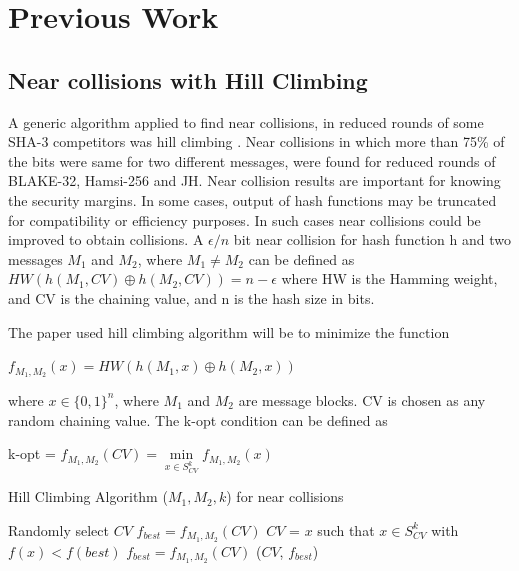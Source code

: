 \documentclass[12pt]{artikel3}                  %
\begin{document}
\section{Previous Work}

\subsection{Near collisions with Hill Climbing}

A generic algorithm applied to find near collisions, in reduced rounds of some SHA-3 competitors was hill climbing
\cite{00029}. Near collisions in which more than 75\% of the bits were same for two different messages, were found 
for reduced rounds of BLAKE-32, Hamsi-256 and JH. Near collision results are important for knowing the security
margins. In some cases, output of hash functions may be truncated for compatibility or efficiency purposes. In 
such cases near collisions could be improved to obtain collisions. A $\epsilon / n $ bit near collision for hash 
function h and two messages $M_{1}$ and $M_{2}$, where $M_{1} \neq M_{2}$ can be defined as
$HW( h( M_{1}, CV ) \oplus h( M_{2}, CV ) ) = n - \epsilon $ where HW is the Hamming weight, and CV is the chaining
value, and n is the hash size in bits.

The paper used hill climbing algorithm will be to minimize the function 

\begin{center}$f_{M_{1}, M_{2}}(x) = HW( h(M_{1}, x) \oplus h(M_{2}, x) )$\end{center}

where $x \in \{0, 1\}^{n}$, where $M_{1}$ and $M_{2}$ are message blocks. CV is chosen as any random chaining value.
The k-opt condition can be defined as 

\begin{center}k-opt = $f_{M_{1}, M_{2}} (CV) =  \min\limits_{x \in S^{k}_{CV}} f_{M_{1}, M_{2}} (x)$\end{center}

\begin{algorithm}
  \caption{ Hill Climbing Algorithm ($M_{1}, M_{2}, k$) for near collisions }
  \begin{algorithmic}[1]
    \State Randomly select $CV$
    \State $f_{best} = f_{M_{1}, M_{2}}(CV)$
    \State {}
    \State $CV$ = $x$ such that $x \in S^{k}_{CV}$ with $f(x) < f(best)$
    \State $f_{best} = f_{M_{1}, M_{2}}(CV)$
    \State \EndWhile
    \State \Return ($CV$, $f_{best}$)
  \end{algorithmic}
\end{algorithm}
\end{document}
